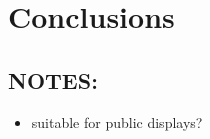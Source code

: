 \chapter{Conclusions}

\section{NOTES:}
\begin{itemize}
	\item suitable for public displays?

\end{itemize}